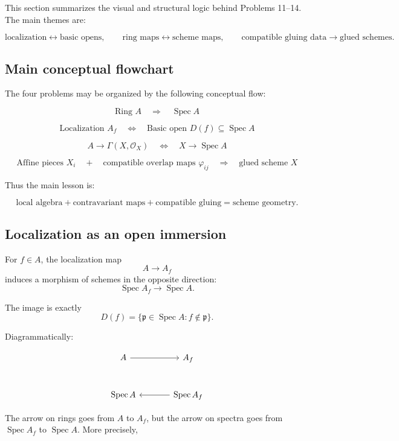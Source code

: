 \documentclass[12pt,a4paper]{article}
\newcommand{\OO}{\mathcal{O}}
\newcommand{\Spec}{\operatorname{Spec}}
\theoremstyle{notespace}
\begin{document}
This section summarizes the visual and structural logic behind Problems 11--14. The main themes are:

\[
\text{localization} \longleftrightarrow \text{basic opens},
\qquad
\text{ring maps} \longleftrightarrow \text{scheme maps},
\qquad
\text{compatible gluing data} \longrightarrow \text{glued schemes}.
\]

\subsection{Main conceptual flowchart}

The four problems may be organized by the following conceptual flow:

\[
\boxed{
	\text{Ring }A
}
\quad\Longrightarrow\quad
\boxed{
	\Spec A
}
\]

\[
\boxed{
	\text{Localization }A_f
}
\quad\Longleftrightarrow\quad
\boxed{
	\text{Basic open }D(f)\subseteq \Spec A
}
\]

\[
\boxed{
	A\to \Gamma(X,\OO_X)
}
\quad\Longleftrightarrow\quad
\boxed{
	X\to \Spec A
}
\]

\[
\boxed{
	\text{Affine pieces }X_i
}
\quad+\quad
\boxed{
	\text{compatible overlap maps }\varphi_{ij}
}
\quad\Longrightarrow\quad
\boxed{
	\text{glued scheme }X
}
\]

Thus the main lesson is:

\[
\boxed{
	\text{local algebra}
	+
	\text{contravariant maps}
	+
	\text{compatible gluing}
	=
	\text{scheme geometry}.
}
\]

\subsection{Localization as an open immersion}

For \(f\in A\), the localization map
\[
A\longrightarrow A_f
\]
induces a morphism of schemes in the opposite direction:
\[
\Spec A_f\longrightarrow \Spec A.
\]

The image is exactly
\[
D(f)=\{\mathfrak p\in \Spec A:f\notin\mathfrak p\}.
\]

Diagrammatically:

\[
\begin{tikzcd}[column sep=large,row sep=large]
	A \arrow[r] & A_f \\
	\Spec A & \Spec A_f \arrow[l]
\end{tikzcd}
\]

The arrow on rings goes from \(A\) to \(A_f\), but the arrow on spectra goes from \(\Spec A_f\) to \(\Spec A\). More precisely,
\end{document}
